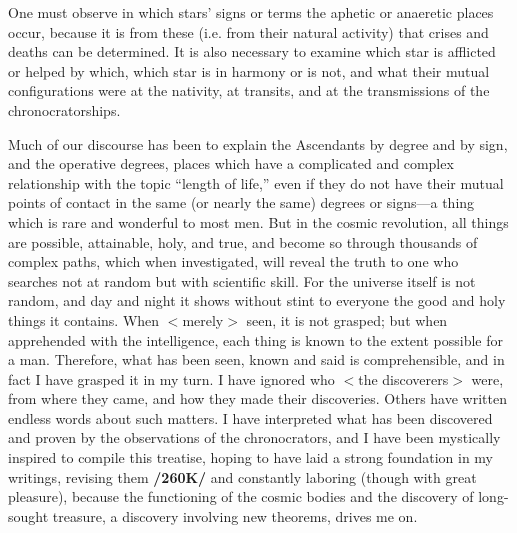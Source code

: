 One must observe in which stars’ signs or terms the aphetic or anaeretic places occur, because it is from these (i.e. from their natural activity) that crises and deaths can be determined. It is also necessary to examine which star is afflicted or helped by which, which star is in harmony or is not, and what their mutual configurations were at the nativity, at transits, and at the transmissions of the chronocratorships.

Much of our discourse has been to explain the Ascendants by degree and by sign, and the operative degrees, places which have a complicated and complex relationship with the topic “length of life,” even if they do not have their mutual points of contact in the same (or nearly the same) degrees or signs—a thing which is rare and wonderful to most men. But in the cosmic revolution, all things are possible, attainable, holy, and true, and become so through thousands of complex paths, which when investigated, will reveal the truth to one who searches not at random but with scientific skill. For the universe itself is not random, and day and night it shows without stint to everyone the good and holy things it contains. When $<$merely$>$ seen, it is not grasped; but when apprehended with the intelligence, each thing is known to the extent possible for a man. Therefore, what has been seen, known and said is comprehensible, and in fact I have grasped it in my turn. I have ignored who $<$the discoverers$>$ were, from where they came, and how they made their discoveries. Others have written endless words about such matters. I have interpreted
what has been discovered and proven by the observations of the chronocrators, and I have been mystically inspired to compile this treatise, hoping to have laid a strong foundation in my writings, revising them \textbf{/260K/} and constantly laboring (though with great pleasure), because the functioning of the cosmic bodies and the discovery of long-sought treasure, a discovery involving new theorems, drives me on.

\newpage